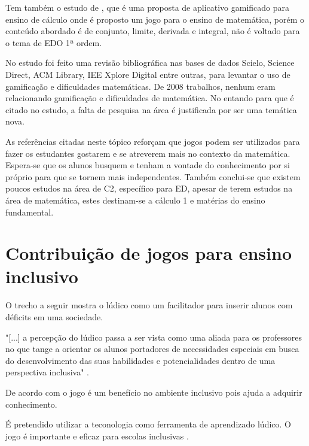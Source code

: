 Tem também o estudo de \cite{appcalculo}, que é uma proposta de aplicativo gamificado para ensino de cálculo onde é proposto um jogo para o ensino de matemática, porém o conteúdo abordado é de conjunto, limite, derivada e integral, não é voltado para o tema de EDO 1ª ordem.

No estudo \cite{revbibmatgam} foi feito uma revisão bibliográfica nas bases de dados Scielo, Science Direct, ACM Library, IEE Xplore Digital entre outras, para levantar o uso de gamificação e dificuldades matemáticas. De 2008 trabalhos, nenhum eram relacionando gamificação e dificuldades de matemática. No entando para \cite{dicheva} que é citado no estudo, a falta de pesquisa na área é justificada por ser uma temática nova.

As referências citadas neste tópico reforçam que jogos podem ser utilizados para fazer os estudantes gostarem e se atreverem mais no contexto da matemática. Espera-se que os alunos busquem e tenham a vontade do conhecimento por si próprio para que se tornem mais independentes. Também conclui-se que existem poucos estudos na área de C2, específico para ED, apesar de terem estudos na área de matemática, estes destinam-se a cálculo 1 e matérias do ensino fundamental.

\section[Contribuição de jogos para ensino inclusivo]{Contribuição de jogos para ensino inclusivo}

O trecho a seguir mostra o lúdico como um facilitador para inserir alunos com déficits em uma sociedade. 

"[...] a percepção do lúdico passa a ser vista como uma aliada para os professores no que tange a orientar os alunos portadores de necessidades especiais em busca do desenvolvimento das suas habilidades e potencialidades dentro de uma perspectiva inclusiva"  \cite{jogoPratPedagoc}.

De acordo com \cite{jogoPratPedagoc} o jogo é um benefício no ambiente inclusivo pois ajuda a adquirir conhecimento.

É pretendido utilizar a teconologia como ferramenta de aprendizado lúdico. O jogo é importante e eficaz para escolas inclusivas \cite{jogoPratPedagoc}.

